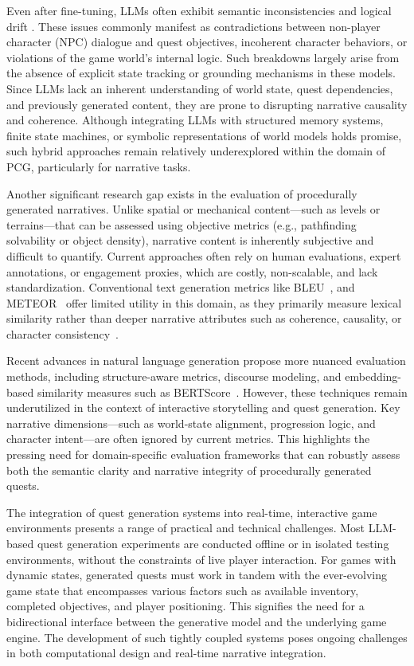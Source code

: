 Even after fine-tuning, LLMs often exhibit semantic inconsistencies and logical drift \cite{luo2023empirical,huang2025survey}.
These issues commonly manifest as contradictions between non-player character
(NPC) dialogue and quest objectives, incoherent character behaviors, or violations of the
game world's internal logic. Such breakdowns largely arise from the absence of explicit
state tracking or grounding mechanisms in these models. Since LLMs lack an inherent understanding
of world state, quest dependencies, and previously generated content, they are
prone to disrupting narrative causality and coherence. Although integrating LLMs with
structured memory systems, finite state machines, or symbolic representations of world
models holds promise, such hybrid approaches remain relatively underexplored within the
domain of PCG, particularly for narrative tasks.

Another significant research gap exists in the evaluation of procedurally generated
narratives. Unlike spatial or mechanical content—such as levels or terrains—that can be
assessed using objective metrics (e.g., pathfinding solvability or object density), narrative
content is inherently subjective and difficult to quantify. Current approaches often rely
on human evaluations, expert annotations, or engagement proxies, which are costly, non-scalable,
and lack standardization. Conventional text generation metrics like BLEU~\cite{papineni02bleu},
and METEOR~\cite{banarjee2005} offer limited utility in this domain, as they primarily measure lexical
similarity rather than deeper narrative attributes such as coherence, causality, or character
consistency~\cite{celikyilmaz2020evaluation}.

Recent advances in natural language generation propose more nuanced evaluation
methods, including structure-aware metrics, discourse modeling, and embedding-based
similarity measures such as BERTScore~\cite{zhang2019bertscore}. However, these techniques remain underutilized
in the context of interactive storytelling and quest generation. Key narrative
dimensions—such as world-state alignment, progression logic, and character intent—are
often ignored by current metrics. This highlights the pressing need for domain-specific
evaluation frameworks that can robustly assess both the semantic clarity and narrative
integrity of procedurally generated quests.

The integration of quest generation systems into real-time, interactive game environments
presents a range of practical and technical challenges. Most LLM-based quest
generation experiments are conducted offline or in isolated testing environments, without
the constraints of live player interaction. For games with dynamic states, generated quests
must work in tandem with the ever-evolving game state that encompasses various factors
such as available inventory, completed objectives, and player positioning. This signifies
the need for a bidirectional interface between the generative model and the underlying
game engine. The development of such tightly coupled systems poses ongoing challenges
in both computational design and real-time narrative integration.

